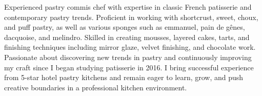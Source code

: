 

\begin{cvparagraph}

Experienced pastry commis chef with expertise in classic French patisserie and contemporary pastry trends. Proficient in working with shortcrust, sweet, choux, and puff pastry, as well as various sponges such as emmanuel, pain de gênes, dacquoise, and melindro. Skilled in creating mousses, layered cakes, tarts, and finishing techniques including mirror glaze, velvet finishing, and chocolate work. Passionate about discovering new trends in pastry and continuously improving my craft since I began studying patisserie in 2016. I bring successful experience from 5-star hotel pastry kitchens and remain eager to learn, grow, and push creative boundaries in a professional kitchen environment.
\end{cvparagraph}
